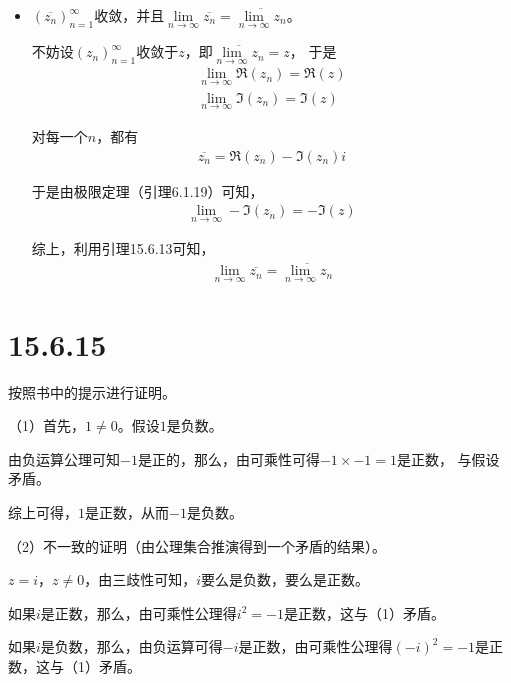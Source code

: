 \documentclass{article}
\begin{document}
\begin{itemize}
  \item $(\overline{z_n})_{n = 1}^\infty$收敛，并且$\lim\limits_{n \to \infty} \overline{z_n} = \overline{\lim\limits_{n \to \infty} z_n}$。

        不妨设$(z_n)_{n = 1}^\infty$收敛于$z$，即$\overline{\lim\limits_{n \to \infty} z_n} = z$，
        于是
        \begin{align*}
          \lim\limits_{n \to \infty} \mathfrak{R}(z_n) = \mathfrak{R}(z) \\
          \lim\limits_{n \to \infty} \mathfrak{I}(z_n) = \mathfrak{I}(z)
        \end{align*}

        对每一个$n$，都有
        \begin{align*}
          \overline{z_n} = \mathfrak{R}(z_n) - \mathfrak{I}(z_n) i
        \end{align*}

        于是由极限定理（引理6.1.19）可知，
        \begin{align*}
          \lim\limits_{n \to \infty} -\mathfrak{I}(z_n) = -\mathfrak{I}(z)
        \end{align*}

        综上，利用引理15.6.13可知，
        \begin{align*}
          \lim\limits_{n \to \infty} \overline{z_n} = \overline{\lim\limits_{n \to \infty} z_n}
        \end{align*}
\end{itemize}

\section*{15.6.15}

按照书中的提示进行证明。

（1）首先，$1 \neq 0$。假设$1$是负数。

由负运算公理可知$-1$是正的，那么，由可乘性可得$-1 \times -1 = 1$是正数，
与假设矛盾。

综上可得，$1$是正数，从而$-1$是负数。

（2）不一致的证明（由公理集合推演得到一个矛盾的结果）。



$z = i$，$z \neq 0$，由三歧性可知，$i$要么是负数，要么是正数。

如果$i$是正数，那么，由可乘性公理得$i^2 = -1$是正数，这与（1）矛盾。

如果$i$是负数，那么，由负运算可得$-i$是正数，由可乘性公理得$(-i)^2 = -1$是正数，这与（1）矛盾。
\end{document}
